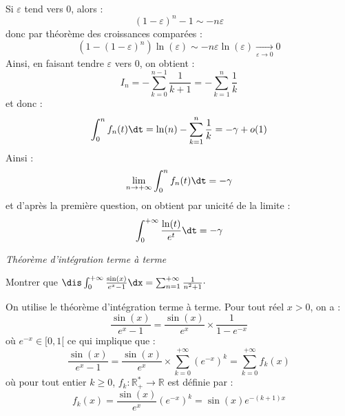 \documentclass[a4paper,10pt]{report}
\begin{document}
\begin{enumerate}
\begin{align*}
 \end{align*}
 Si $\varepsilon$ tend vers $0$, alors :
 $$ (1- \varepsilon)^n -1 \sim -n \varepsilon$$
 donc par théorème des croissances comparées :
 $$ (1-(1- \varepsilon)^n)\ln(\varepsilon) \sim - n \varepsilon \ln(\varepsilon) \underset{\varepsilon \rightarrow 0}{\longrightarrow} 0$$
 Ainsi, en faisant tendre $\varepsilon$ vers $0$, on obtient :
 $$ I_n = - \sum_{k=0}^{n-1} \dfrac{1}{k+1} = - \sum_{k=1}^n \dfrac{1}{k}$$
 et donc :
 $$ \int_{0}^n f_n(t) \dt = \ln(n)  - \sum_{k=1}^n \dfrac{1}{k} = -\gamma + o(1)$$
 Ainsi :
 $$ \lim_{n \rightarrow + \infty} \int_{0}^n f_n(t) \dt = - \gamma$$
 et d'après la première question, on obtient par unicité de la limite : 
 $$  \int_{0}^{+ \infty} \dfrac{\ln(t)}{e^t} \dt = - \gamma $$
\end{enumerate}

\medskip

\begin{center}
\textit{{ {\large Théorème d'intégration terme à terme}}}
\end{center}

\medskip

\begin{Exercice}{} Montrer que $\dis \int_{0}^{+ \infty} \frac{\sin(x)}{e^x-1} \dx = \sum_{n=1}^{+ \infty} \frac{1}{n^2+1}\cdot$
\end{Exercice}

\corr On utilise le théorème d'intégration terme à terme. Pour tout réel $x>0$, on a :
$$ \frac{\sin(x)}{e^x-1}  = \dfrac{\sin(x)}{e^x} \times \dfrac{1}{1-e^{-x}}$$
où $e^{-x} \in [0,1[$ ce qui implique que :
$$ \frac{\sin(x)}{e^x-1}  = \dfrac{\sin(x)}{e^x} \times \sum_{k=0}^{+ \infty} (e^{-x})^k  = \sum_{k=0}^{+ \infty} f_k(x)$$
où pour tout entier $k \geq 0$, $f_k : \mathbb{R}_+^* \rightarrow \mathbb{R}$ est définie par :
$$ f_k(x) = \dfrac{\sin(x)}{e^x} (e^{-x})^k = \sin(x) e^{-(k+1)x}$$
\end{document}
